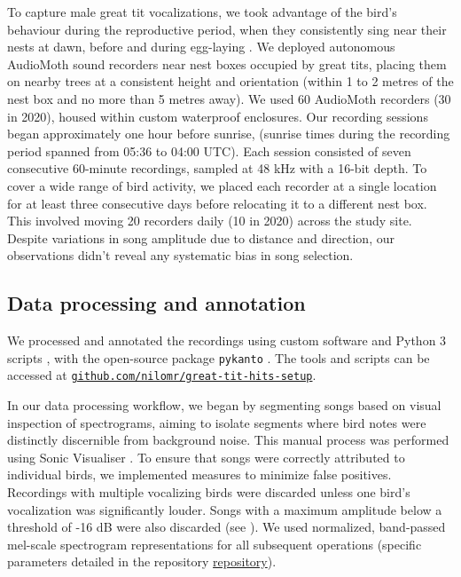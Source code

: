 To capture male great tit vocalizations, we took advantage of the bird's behaviour during the reproductive period, when they consistently sing near their nests at dawn, before and during egg-laying \parencite{mace1987}. We deployed autonomous AudioMoth \autocite{hill2019} sound recorders near nest boxes occupied by great tits, placing them on nearby trees at a consistent height and orientation (within 1 to 2 metres of the nest box and no more than 5 metres away). We used 60 AudioMoth recorders (30 in 2020), housed within custom waterproof enclosures. Our recording sessions began approximately one hour before sunrise, (sunrise times during the recording period spanned from 05:36 to 04:00 UTC). Each session consisted of seven consecutive 60-minute recordings, sampled at 48 kHz with a 16-bit depth. To cover a wide range of bird activity, we placed each recorder at a single location for at least three consecutive days before relocating it to a different nest box. This involved moving 20 recorders daily (10 in 2020) across the study site. Despite variations in song amplitude due to distance and direction, our observations didn't reveal any systematic bias in song selection.

\subsection{Data processing and annotation}

We processed and annotated the recordings using custom software and Python 3 scripts \parencite{vanrossum1995}, with the open-source package \texttt{pykanto} \parencite{merinorecalde2023}. The tools and scripts can be accessed at \href{https://github.com/nilomr/great-tit-hits-setup}{\nolinkurl{github.com/nilomr/great-tit-hits-setup}}. 

\noindent In our data processing workflow, we began by segmenting songs based on visual inspection of spectrograms, aiming to isolate segments where bird notes were distinctly discernible from background noise. This manual process was performed using Sonic Visualiser \parencite{cannam2010}. To ensure that songs were correctly attributed to individual birds, we implemented measures to minimize false positives. Recordings with multiple vocalizing birds were discarded unless one bird's vocalization was significantly louder. Songs with a maximum amplitude below a threshold of -16 dB were also discarded (see \cite{merinorecalde2023a}). We used normalized, band-passed mel-scale spectrogram representations for all subsequent operations (specific parameters detailed in the repository \href{https://github.com/nilomr/great-tit-hits-setup}{repository}).

